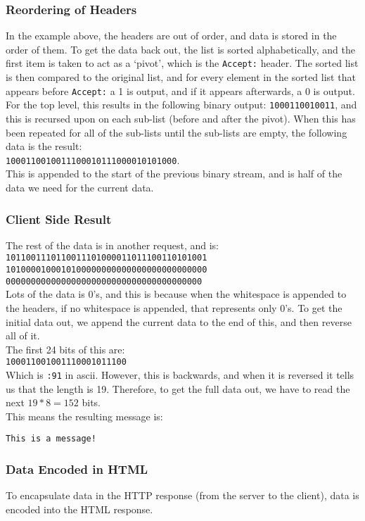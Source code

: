 \subsubsection{Reordering of Headers}
In the example above, the headers are out of order, and data is stored in the order of them.
To get the data back out, the list is sorted alphabetically, and the first item is taken to act as a `pivot', which is the \texttt{Accept:} header.
The sorted list is then compared to the original list, and for every element in the sorted list that appears before \texttt{Accept:} a 1 is output, and if it appears afterwards, a 0 is output.
For the top level, this results in the following binary output: \texttt{1000110010011}, and this is recursed upon on each sub-list (before and after the pivot).
When this has been repeated for all of the sub-lists until the sub-lists are empty, the following data is the result:\\
\texttt{1000110010011100010111000010101000}.\\
This is appended to the start of the previous binary stream, and is half of the data we need for the current data.
\subsubsection{Client Side Result}
The rest of the data is in another request, and is:\\
\texttt{1011001110110011101000011011100110101001\\
1010000100010100000000000000000000000000\\
000000000000000000000000000000000000000}\\
Lots of the data is 0's, and this is because when the whitespace is appended to the headers, if no whitespace is appended, that represents only 0's.
To get the initial data out, we append the current data to the end of this, and then reverse all of it.\\
The first 24 bits of this are:\\
\texttt{100011001001110001011100}\\
Which is \texttt{:91} in ascii. However, this is backwards, and when it is reversed it tells us that the length is 19. Therefore, to get the full data out, we have to read the next $19 * 8 = 152$ bits.\\
This means the resulting message is:\par
\texttt{This is a message!}

\newpage
\subsubsection{Data Encoded in HTML}
To encapsulate data in the HTTP response (from the server to the client), data is encoded into the HTML response.

